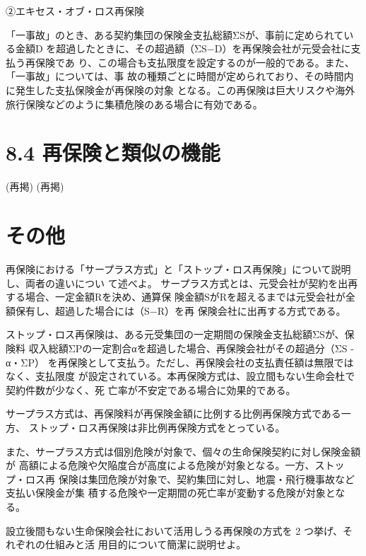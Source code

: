 \documentclass[report,gutter=10mm,fore-edge=10mm,uplatex,dvipdfmx]{jlreq}
\begin{document}
\noindent ②エキセス・オブ・ロス再保険

「一事故」のとき、ある契約集団の保険金支払総額ΣSが、事前に定められている金額D
を超過したときに、その超過額（ΣS−D）を再保険会社が元受会社に支払う再保険であ
り、この場合も支払限度を設定するのが一般的である。また、「一事故」については、事
故の種類ごとに時間が定められており、その時間内に発生した支払保険金が再保険の対象
となる。この再保険は巨大リスクや海外旅行保険などのように集積危険のある場合に有効である。



\section{8.4 再保険と類似の機能}
(再掲)
(再掲)

\section{その他}
再保険における「サープラス方式」と「ストップ・ロス再保険」について説明し、両者の違いについ
て述べよ。
\answer{}
サープラス方式とは、元受会社が契約を出再する場合、一定金額Rを決め、通算保
険金額SがRを超えるまでは元受会社が全額保有し、超過した場合には（S−R）を再
保険会社に出再する方式である。

ストップ・ロス再保険は、ある元受集団の一定期間の保険金支払総額ΣSが、保険料
収入総額ΣPの一定割合αを超過した場合、再保険会社がその超過分（ΣS - α・ΣP）
を再保険として支払う。ただし、再保険会社の支払責任額は無限ではなく、支払限度
が設定されている。本再保険方式は、設立間もない生命会杜で契約件数が少なく、死
亡率が不安定である場合に効果的である。

サープラス方式は、再保険料が再保険金額に比例する比例再保険方式である一方、
ストップ・ロス再保険は非比例再保険方式をとっている。

また、サープラス方式は個別危険が対象で、個々の生命保険契約に対し保険金額が
高額による危険や欠陥度合が高度による危険が対象となる。一方、ストップ・ロス再
保険は集団危険が対象で、契約集団に対し、地震・飛行機事故など支払い保険金が集
積する危険や一定期間の死亡率が変動する危険が対象となる。

設立後間もない生命保険会社において活用しうる再保険の方式を 2 つ挙げ、それぞれの仕組みと活
用目的について簡潔に説明せよ。
\end{document}
